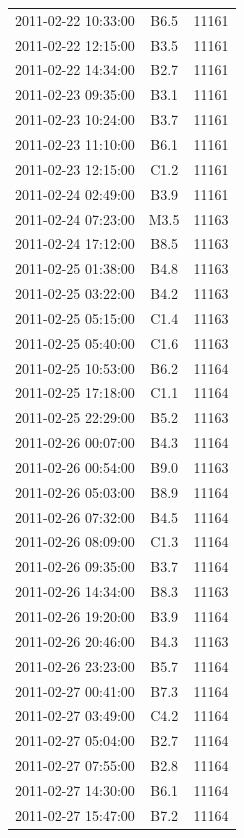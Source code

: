 \documentclass[referee,a4paper,12pt]{swsc}
\begin{document}
\begin{linenumbers}
\begin{longtable}{c|c|c}
		2011-02-22 10:33:00 & B6.5 & 11161 \\ 
		2011-02-22 12:15:00 & B3.5 & 11161 \\ 
		2011-02-22 14:34:00 & B2.7 & 11161 \\ 
		2011-02-23 09:35:00 & B3.1 & 11161 \\ 
		2011-02-23 10:24:00 & B3.7 & 11161 \\ 
		2011-02-23 11:10:00 & B6.1 & 11161 \\ 
		2011-02-23 12:15:00 & C1.2 & 11161 \\ 
		2011-02-24 02:49:00 & B3.9 & 11161 \\ 
		2011-02-24 07:23:00 & M3.5 & 11163 \\ 
		2011-02-24 17:12:00 & B8.5 & 11163 \\ 
		2011-02-25 01:38:00 & B4.8 & 11163 \\ 
		2011-02-25 03:22:00 & B4.2 & 11163 \\ 
		2011-02-25 05:15:00 & C1.4 & 11163 \\ 
		2011-02-25 05:40:00 & C1.6 & 11163 \\ 
		2011-02-25 10:53:00 & B6.2 & 11164 \\ 
		2011-02-25 17:18:00 & C1.1 & 11164 \\ 
		2011-02-25 22:29:00 & B5.2 & 11163 \\ 
		2011-02-26 00:07:00 & B4.3 & 11164 \\ 
		2011-02-26 00:54:00 & B9.0 & 11163 \\ 
		2011-02-26 05:03:00 & B8.9 & 11164 \\ 
		2011-02-26 07:32:00 & B4.5 & 11164 \\ 
		2011-02-26 08:09:00 & C1.3 & 11164 \\ 
		2011-02-26 09:35:00 & B3.7 & 11164 \\ 
		2011-02-26 14:34:00 & B8.3 & 11163 \\ 
		2011-02-26 19:20:00 & B3.9 & 11164 \\ 
		2011-02-26 20:46:00 & B4.3 & 11163 \\ 
		2011-02-26 23:23:00 & B5.7 & 11164 \\ 
		2011-02-27 00:41:00 & B7.3 & 11164 \\ 
		2011-02-27 03:49:00 & C4.2 & 11164 \\ 
		2011-02-27 05:04:00 & B2.7 & 11164 \\ 
		2011-02-27 07:55:00 & B2.8 & 11164 \\ 
		2011-02-27 14:30:00 & B6.1 & 11164 \\ 
		2011-02-27 15:47:00 & B7.2 & 11164 \\ 

\end{longtable}
\end{linenumbers}
\end{document}
